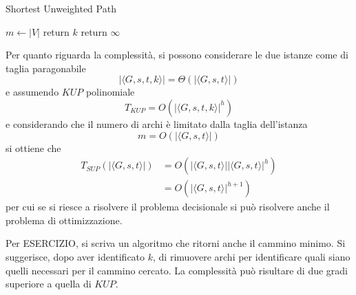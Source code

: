 \begin{algorithm}[H]
\caption{Shortest Unweighted Path}\label{alg:sup}
\begin{algorithmic}[1]
        \State $m \gets |V|$
                \State return $k$
            \EndIf
        \EndFor
        \State return $\infty$
    \EndProcedure
\end{algorithmic}
\end{algorithm}
Per quanto riguarda la complessità, si possono considerare le due istanze come di taglia paragonabile
\begin{equation*}
    |\langle G, s, t, k \rangle| = \Theta \left( |\langle G, s, t \rangle| \right)
\end{equation*}
e assumendo $KUP$ polinomiale
\begin{equation*}
    T_{KUP} = O \left( |\langle G, s, t, k \rangle|^{h} \right)
\end{equation*}
e considerando che il numero di archi è limitato dalla taglia dell'istanza
\begin{equation}
    m = O \left( |\langle G, s, t \rangle| \right)
    \label{eq:tagliamgst}
\end{equation}
si ottiene che
\begin{align*}
    T_{SUP} \left( |\langle G, s, t \rangle| \right) &= O \left( |\langle G, s, t \rangle||\langle G, s, t \rangle|^{h} \right) \\
    &= O \left( |\langle G, s, t \rangle|^{h+1} \right)
\end{align*}
per cui se si riesce a risolvere il problema decisionale si può risolvere anche il problema di ottimizzazione.

Per ESERCIZIO, si scriva un algoritmo che ritorni anche il cammino minimo. Si suggerisce, dopo aver identificato $k$, di rimuovere archi per identificare quali siano quelli necessari per il cammino cercato. La complessità può risultare di due gradi superiore a quella di $KUP$.

